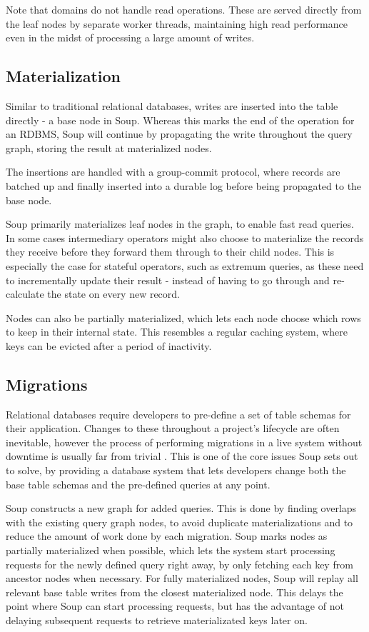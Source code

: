 \documentclass[b5paper]{report}
\begin{document}
Note that domains do not handle read operations. These are served directly from
the leaf nodes by separate worker threads, maintaining high read performance
even in the midst of processing a large amount of writes.

\subsection{Materialization}
Similar to traditional relational databases, writes are inserted into the
table directly - a base node in Soup. Whereas this marks the end of the
operation for an RDBMS, Soup will continue by propagating the write throughout
the query graph, storing the result at materialized nodes.

The insertions are handled with a group-commit protocol, where records are
batched up and finally inserted into a durable log before being propagated to
the base node.

Soup primarily materializes leaf nodes in the graph, to enable fast read
queries. In some cases intermediary operators might also choose to materialize
the records they receive before they forward them through to their child nodes.
This is especially the case for stateful operators, such as extremum queries, as
these need to incrementally update their result - instead of having to go
through and re-calculate the state on every new record.

Nodes can also be partially materialized, which lets each node choose which rows
to keep in their internal state. This resembles a regular caching system, where
keys can be evicted after a period of inactivity.

\subsection{Migrations}
Relational databases require developers to pre-define a set of table schemas for
their application. Changes to these throughout a project's lifecycle are often
inevitable, however the process of performing migrations in a live
system without downtime is usually far from trivial \cite{stripe}. This is one
of the core issues Soup sets out to solve, by providing a database system that
lets developers change both the base table schemas and the pre-defined queries
at any point.

Soup constructs a new graph for added queries. This is done by finding overlaps
with the existing query graph nodes, to avoid duplicate materializations and
to reduce the amount of work done by each migration. Soup marks nodes as
partially materialized when possible, which lets the system start processing
requests for the newly defined query right away, by only fetching each key from
ancestor nodes when necessary. For fully materialized nodes, Soup will replay
all relevant base table writes from the closest materialized node. This
delays the point where Soup can start processing requests, but has the advantage
of not delaying subsequent requests to retrieve materializated keys later on.
\end{document}
